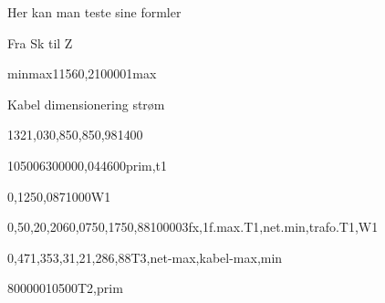 \documentclass[a4paper,oneside,10pt,danish]{report}
\begin{document}
Her kan man teste sine formler

 
Fra Sk til Z
\begin{FraSkTilZ}{min}{max}{115}{6}{0,2}{10000}{1}{max}
\end{FraSkTilZ}

Kabel dimensionering strøm
\begin{Iz,min}{132}{1,03}{0,85}{0,85}{0,98}{1}{400}
\end{Iz,min}

\begin{Ztrafo}{10500}{630000}{0,04}{4600}{prim,t1}
\end{Ztrafo}

\begin{Zkabel}{1}{0,125}{0,087}{1000}{W1}
\end{Zkabel}


\begin{ZtilIkHV}{0,5}{0,2}{0,206}{0,075}{0,175}{0,88}{10000}{3fx,1f.max.T1,net.min,trafo.T1,W1}
\end{ZtilIkHV}

\begin{Ik1MinSekTrafoHV}{0,47}{1,35}{3,3}{1,2}{1,28}{6,88}{T3,net-max,kabel-max,min}
\end{Ik1MinSekTrafoHV}

\begin{TrafoFuldlast}{800000}{10500}{T2,prim}
\end{TrafoFuldlast}
\end{document}
